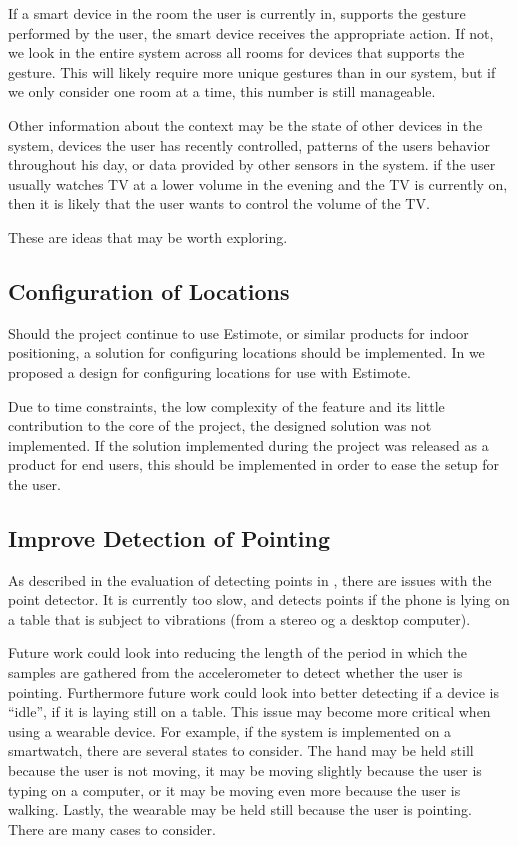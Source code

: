 If a smart device in the room the user is currently in, 
supports the gesture performed by the user, 
the smart device receives the appropriate action. 
If not, we look in the entire system across all rooms for devices that supports the gesture.
This will likely require more unique gestures than in our system,
but if we only consider one room at a time, 
this number is still manageable.

Other information about the context may be the state of other devices in the system, 
devices the user has recently controlled, 
patterns of the users behavior throughout his day, 
or data provided by other sensors in the system.
\eg if the user usually watches TV at a lower volume in the evening and the TV is currently on, then it is likely that the user wants to control the volume of the TV.

These are ideas that may be worth exploring. 

\subsection{Configuration of Locations}

Should the project continue to use Estimote, 
or similar products for indoor positioning, 
a solution for configuring locations should be implemented. 
In  we proposed a design for configuring locations for use with Estimote. 

Due to time constraints, 
the low complexity of the feature and its little contribution to the core of the project, 
the designed solution was not implemented. 
If the solution implemented during the project was released as a product for end users, 
this should be implemented in order to ease the setup for the user.

\subsection{Improve Detection of Pointing}

As described in the evaluation of detecting points in , 
there are issues with the point detector. 
It is currently too slow, 
and detects points if the phone is lying on a table that is subject to vibrations (from \eg a stereo og a desktop computer).

Future work could look into reducing the length of the period in which the samples are gathered from the accelerometer to detect whether the user is pointing.
Furthermore future work could look into better detecting if a device is ``idle'', 
\ie if it is laying still on \eg a table. 
This issue may become more critical when using a wearable device. 
For example, if the system is implemented on a smartwatch, 
there are several states to consider. 
The hand may be held still because the user is not moving, 
it may be moving slightly because the user is typing on a computer, 
or it may be moving even more because the user is walking. 
Lastly, the wearable may be held still because the user is pointing. 
There are many cases to consider.

